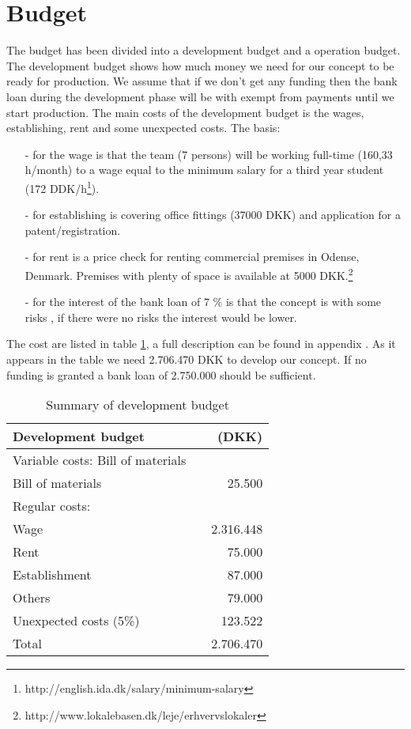 \section{Budget}
\label{budget_label}
The budget has been divided into a development budget and a operation budget. The development budget  shows how much money we need for our concept to be ready for production. We assume that if we don't get any funding then the bank loan during the development phase will be with exempt from payments until we start production. The main costs of the development budget is the wages, establishing, rent and some unexpected costs. 
The basis: \begin{itemize}
\item[-] for the wage is that the team (7 persons) will be working full-time (160,33 h/month) to a wage equal to the minimum salary for a third year student (172 DDK/h\footnote{http://english.ida.dk/salary/minimum-salary}).
\item[-] for establishing is covering office fittings (37000 DKK) and application for a patent/registration.
\item[-] for rent is a price check for renting commercial premises in Odense, Denmark. Premises with plenty of space is available at 5000 DKK.\footnote{http://www.lokalebasen.dk/leje/erhvervslokaler}
\item[-] for the interest of the bank loan of 7 \% is that the concept is with some risks , if there were no risks the interest would be lower. 
\end{itemize} 
The cost are listed in table \ref{devbud}, a full description can be found in appendix . As it appears in the table we need 2.706.470 DKK to develop our concept. If no funding is granted a bank loan of 2.750.000 should be sufficient.

\begin{table}[h!]
\label{devbud}
\centering
\begin{tabular}{l c r}
Development budget &&(DKK)\\
\hline
Variable costs: Bill of materials	  	&	& \\
Bill of materials	  					&	& 25.500  \\
Regular costs: 						  	&  	& 		\\
Wage    								&	& 2.316.448\\
Rent 									&   & 75.000\\
Establishment							&   & 87.000\\
Others				 					&   & 79.000\\
Unexpected costs (5\%) 					&   & 123.522\\
\hline
Total         							&   & 2.706.470\\
\end{tabular}
\caption{Summary of development budget}
\end{table}

